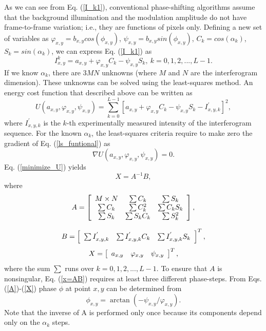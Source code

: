 \documentclass[letterpaper,12pt]{article}   %
\begin{document}
As we can see from Eq. (\ref{I_k1}), conventional phase-shifting
algorithms assume that the background illumination and the modulation
amplitude do not have frame-to-frame variation; i.e., they are
functions of pixels only. Defining a new set of variables as
$\varphi_{x,y}=b_{x,y}cos(\phi_{x,y})$,
$\psi_{x,y}=b_{x,y}sin(\phi_{x,y})$, $C_k=cos(\alpha_k)$,
$S_k=sin(\alpha_k)$, we can express Eq. (\ref{I_k1}) as
\begin{equation}\label{I_k2}
  I_{x,y}^k=a_{x,y}+\varphi_{x,y}C_k-\psi_{x,y}S_k,\: k=0,1,2,...,L-1.
\end{equation}
If we know $\alpha_k$, there are $3MN$ unknowns (where $M$ and $N$ are
the interferogram dimension). These unknowns can be solved using the
least-squares method. An energy cost function that described above can
be written as
\begin{equation}\label{ls_funtional}
  U(a_{x,y},\varphi_{x,y},\psi_{x,y})=\sum_{k=0}^{L-1}
  [a_{x,y}+\varphi_{x,y}C_k-\psi_{x,y}S_k-I_{x,y,k}^{'}]^2,
\end{equation}
where $I_{x,y,k}^{'}$ is the $k$-th experimentally measured intensity
of the interferogram sequence. For the known $\alpha_k$, the
least-squares criteria require to make zero the gradient of
Eq. (\ref{ls_funtional}) as
\begin{equation}\label{minimize_U}
  \nabla U(a_{x,y},\varphi_{x,y},\psi_{x,y})=0.
\end{equation}
Eq. (\ref{minimize_U}) yields
\begin{equation}\label{x=AB}
  X = A^{-1} B,
\end{equation}
where
\begin{equation}\label{A}
  A = \left[ \begin{array}{c c c}
      M\times N & \sum C_k     & \sum S_k \\
      \sum C_k  & \sum C_k^2   & \sum C_k S_k \\
      \sum S_k  & \sum S_k C_k & \sum S_k^2\end{array} \right],
\end{equation}

\begin{equation}\label{B}
  B = \left[ \begin{array}{c c c}
      \sum I_{x,y,k}^{'} & \sum I_{x,y,k}^{'} C_k & \sum I_{x,y,k}^{'} S_k \end{array}
  \right]^T,
\end{equation}
\begin{equation}\label{X}
  X = \left[ \begin{array}{c c c}
      a_{x,y} & \varphi_{x,y} & \psi_{x,y} \end{array} \right]^T,
\end{equation}
where the sum $\sum$ runs over $k=0,1,2,...,L-1$. To ensure that $A$
is nonsingular, Eq.  (\ref{x=AB}) requires at least three different
phase-steps. From Eqs.  (\ref{A})-(\ref{X}) phase $\phi$ at point
$x,y$ can be determined from
\begin{equation}
  \phi_{x,y} = \arctan(-\psi_{x,y}/\varphi_{x,y}).
\end{equation}
Note that the inverse of A is performed only once because its
components depend only on the $\alpha_k$ steps.
\end{document}
